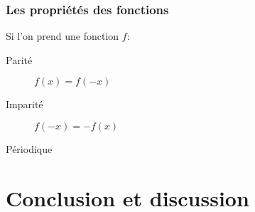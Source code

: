 \documentclass[a4paper]{book}
\begin{document}
    \subsection{Les propriétés des fonctions}
    
    Si l'on prend une fonction $f$:
    \begin{description}
    \item[Parité] $f(x) = f(-x)$
    \item[Imparité] $f(-x) = -f(x)$
    \item[Périodique]
        
    \end{description}
 
    
    \backmatter
 
    \chapter{Conclusion et discussion}
 
    
    \tableofcontents    
    \listoffigures        %
    \listoftables        %
 
\end{document}
